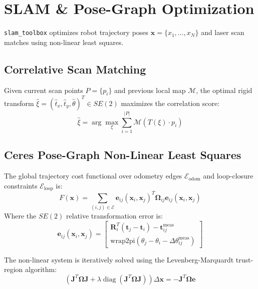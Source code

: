\documentclass[10pt,a4paper]{article}
\begin{document}
\section{SLAM \& Pose-Graph Optimization}

\texttt{slam\_toolbox} optimizes robot trajectory poses $\mathbf{x} = \{x_1, \dots, x_N\}$ and laser scan matches using non-linear least squares.

\subsection{Correlative Scan Matching}
Given current scan points $P = \{p_i\}$ and previous local map $\mathcal{M}$, the optimal rigid transform $\hat{\xi} = (\hat{t}_x, \hat{t}_y, \hat{\theta})^T \in SE(2)$ maximizes the correlation score:
\begin{equation}
\hat{\xi} = \arg\max_{\xi} \sum_{i=1}^{|P|} \mathcal{M}(T(\xi) \cdot p_i)
\end{equation}

\subsection{Ceres Pose-Graph Non-Linear Least Squares}
The global trajectory cost functional over odometry edges $\mathcal{E}_{\text{odom}}$ and loop-closure constraints $\mathcal{E}_{\text{loop}}$ is:
\begin{equation}
F(\mathbf{x}) = \sum_{(i,j) \in \mathcal{E}} \mathbf{e}_{ij}(\mathbf{x}_i, \mathbf{x}_j)^T \mathbf{\Omega}_{ij} \mathbf{e}_{ij}(\mathbf{x}_i, \mathbf{x}_j)
\end{equation}
Where the $SE(2)$ relative transformation error is:
\begin{equation}
\mathbf{e}_{ij}(\mathbf{x}_i, \mathbf{x}_j) = \begin{bmatrix} \mathbf{R}_i^T (\mathbf{t}_j - \mathbf{t}_i) - \mathbf{t}_{ij}^{\text{meas}} \\ \text{wrap2pi}(\theta_j - \theta_i - \Delta\theta_{ij}^{\text{meas}}) \end{bmatrix}
\end{equation}

The non-linear system is iteratively solved using the Levenberg-Marquardt trust-region algorithm:
\begin{equation}
\left(\mathbf{J}^T \mathbf{\Omega} \mathbf{J} + \lambda \operatorname{diag}(\mathbf{J}^T \mathbf{\Omega} \mathbf{J})\right) \Delta \mathbf{x} = -\mathbf{J}^T \mathbf{\Omega} \mathbf{e}
\end{equation}
\end{document}
